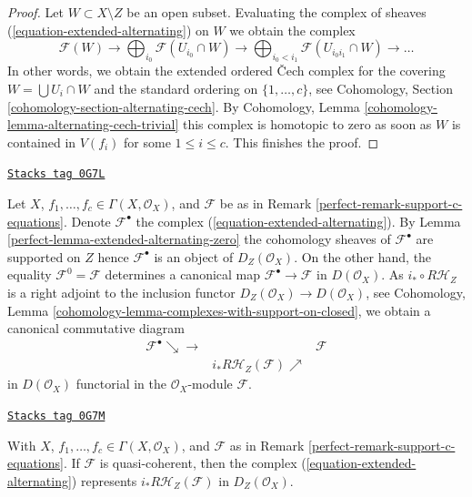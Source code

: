 \begin{proof}
Let $W \subset X \setminus Z$ be an open subset. Evaluating the complex
of sheaves (\ref{equation-extended-alternating}) on $W$ we obtain the
complex
$$
\mathcal{F}(W) \to \bigoplus\nolimits_{i_0} \mathcal{F}(U_{i_0} \cap W) \to
\bigoplus\nolimits_{i_0 < i_1} \mathcal{F}(U_{i_0i_1} \cap W) \to \ldots
$$
In other words, we obtain the extended ordered {\v C}ech complex
for the covering $W = \bigcup U_i \cap W$ and the standard
ordering on $\{1, \ldots, c\}$, see
Cohomology, Section \ref{cohomology-section-alternating-cech}.
By Cohomology, Lemma \ref{cohomology-lemma-alternating-cech-trivial}
this complex is homotopic to zero as soon as $W$ is contained in
$V(f_i)$ for some $1 \leq i \leq c$. This finishes the proof.
\end{proof}

\begin{remark}
\label{perfect-remark-extended-alternating-map-to-support}
\href{https://stacks.math.columbia.edu/tag/0G7L}{\texttt{Stacks tag 0G7L}}

Let $X$, $f_1, \ldots, f_c \in \Gamma(X, \mathcal{O}_X)$, and
$\mathcal{F}$ be as in Remark \ref{perfect-remark-support-c-equations}.
Denote $\mathcal{F}^\bullet$ the complex
(\ref{equation-extended-alternating}). By
Lemma \ref{perfect-lemma-extended-alternating-zero}
the cohomology sheaves of $\mathcal{F}^\bullet$
are supported on $Z$ hence $\mathcal{F}^\bullet$ is an object of
$D_Z(\mathcal{O}_X)$. On the other hand, the equality
$\mathcal{F}^0 = \mathcal{F}$ determines a canonical map
$\mathcal{F}^\bullet \to \mathcal{F}$ in $D(\mathcal{O}_X)$.
As $i_* \circ R\mathcal{H}_Z$ is a right adjoint to the
inclusion functor $D_Z(\mathcal{O}_X) \to D(\mathcal{O}_X)$, see
Cohomology, Lemma \ref{cohomology-lemma-complexes-with-support-on-closed},
we obtain a canonical commutative diagram
$$
\begin{array}{ccc}\mathcal{F}^\bullet \searrow\longrightarrow &  & \mathcal{F} \\  & i_*R\mathcal{H}_Z(\mathcal{F}) \nearrow & \end{array}
$$
in $D(\mathcal{O}_X)$ functorial in the $\mathcal{O}_X$-module $\mathcal{F}$.
\end{remark}

\begin{lemma}
\label{perfect-lemma-extended-alternating-represented}
\href{https://stacks.math.columbia.edu/tag/0G7M}{\texttt{Stacks tag 0G7M}}

With $X$, $f_1, \ldots, f_c \in \Gamma(X, \mathcal{O}_X)$, and
$\mathcal{F}$ as in Remark \ref{perfect-remark-support-c-equations}.
If $\mathcal{F}$ is quasi-coherent, then the complex
(\ref{equation-extended-alternating}) represents
$i_* R\mathcal{H}_Z(\mathcal{F})$ in $D_Z(\mathcal{O}_X)$.
\end{lemma}

